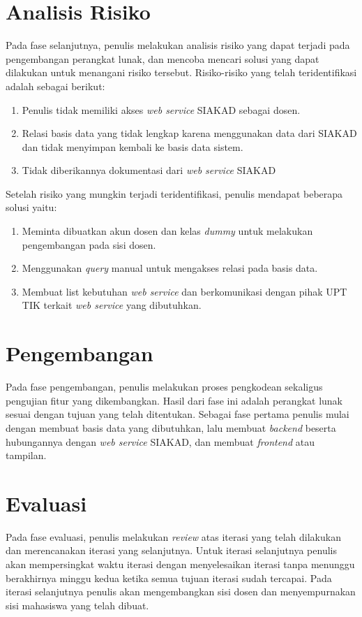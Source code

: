 \section{Analisis Risiko}
	Pada fase selanjutnya, penulis melakukan analisis risiko yang dapat terjadi pada pengembangan perangkat lunak, dan mencoba mencari solusi yang dapat dilakukan untuk menangani risiko tersebut. Risiko-risiko yang telah teridentifikasi adalah sebagai berikut:
\begin{enumerate}
	\item Penulis tidak memiliki akses \textit{web service} SIAKAD sebagai dosen. 
	\item Relasi basis data yang tidak lengkap karena menggunakan data dari SIAKAD dan tidak menyimpan kembali ke basis data sistem.
	\item Tidak diberikannya dokumentasi dari \textit{web service} SIAKAD
\end{enumerate}
Setelah risiko yang mungkin terjadi teridentifikasi, penulis mendapat beberapa solusi yaitu:
\begin{enumerate}
	\item Meminta dibuatkan akun dosen dan kelas \textit{dummy} untuk melakukan pengembangan pada sisi dosen.
	\item Menggunakan \textit{query} manual untuk mengakses relasi pada basis data.
	\item Membuat list kebutuhan \textit{web service} dan berkomunikasi dengan pihak UPT TIK terkait \textit{web service} yang dibutuhkan.
\end{enumerate}

\section{Pengembangan}
	Pada fase pengembangan, penulis melakukan proses pengkodean sekaligus pengujian fitur yang dikembangkan. Hasil dari fase ini adalah perangkat lunak sesuai dengan tujuan yang telah ditentukan. Sebagai fase pertama penulis mulai dengan membuat basis data yang dibutuhkan, lalu membuat \textit{backend} beserta hubungannya dengan \textit{web service} SIAKAD, dan membuat \textit{frontend} atau tampilan.

\section{Evaluasi}
	Pada fase evaluasi, penulis melakukan \textit{review} atas iterasi yang telah dilakukan dan merencanakan iterasi yang selanjutnya. Untuk iterasi selanjutnya penulis akan mempersingkat waktu iterasi dengan menyelesaikan iterasi tanpa menunggu berakhirnya minggu kedua ketika semua tujuan iterasi sudah tercapai. Pada iterasi selanjutnya penulis akan mengembangkan sisi dosen dan menyempurnakan sisi mahasiswa yang telah dibuat.














